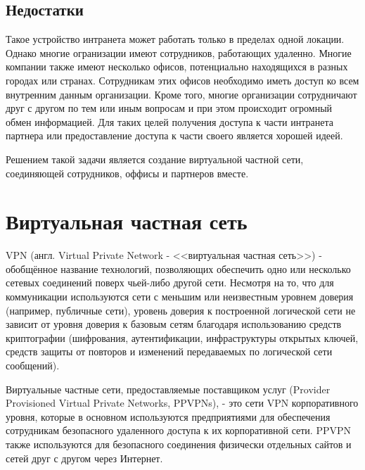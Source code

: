 \documentclass[a4page]{article}
\begin{document}
\subsection{Недостатки}
Такое устройство интранета может работать только в пределах одной локации. Однако многие огранизации имеют сотрудников, работающих удаленно. Многие компании также имеют несколько офисов, потенциально находящихся в разных городах или странах. Сотрудникам этих офисов необходимо иметь доступ ко всем внутренним данным организации. Кроме того, многие организации сотрудничают друг с другом по тем или иным вопросам и при этом происходит огромный обмен информацией. Для таких целей получения доступа к части интранета партнера или предоставление доступа к части своего является хорошей идеей.

Решением такой задачи является создание виртуальной частной сети, соединяющей сотрудников, оффисы и партнеров вместе.

\section{Виртуальная частная сеть}
VPN (англ. Virtual Private Network - <<виртуальная частная сеть>>) - обобщённое название технологий, позволяющих обеспечить одно или несколько сетевых соединений поверх чьей-либо другой сети\cite{enwiki:vpn}\cite{nist-glossary:vpn}. Несмотря на то, что для коммуникации используются сети с меньшим или неизвестным уровнем доверия (например, публичные сети), уровень доверия к построенной логической сети не зависит от уровня доверия к базовым сетям благодаря использованию средств криптографии (шифрования, аутентификации, инфраструктуры открытых ключей, средств защиты от повторов и изменений передаваемых по логической сети сообщений).

Виртуальные частные сети, предоставляемые поставщиком услуг (Provider Provisioned Virtual Private Networks, PPVPNs), - это сети VPN корпоративного уровня, которые в основном используются предприятиями для обеспечения сотрудникам безопасного удаленного доступа к их корпоративной сети. PPVPN также используются для безопасного соединения физически отдельных сайтов и сетей друг с другом через Интернет.
\end{document}
